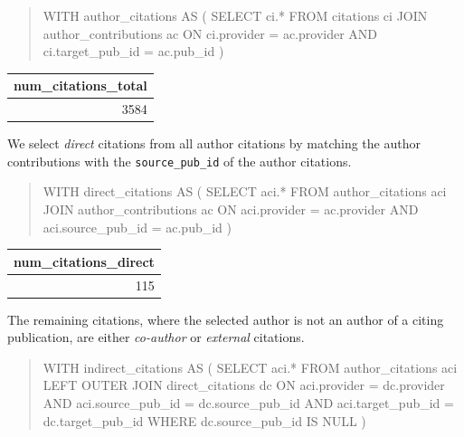 \begin{quote}
    \begin{vercode}
WITH author_citations AS (
    SELECT ci.*
    FROM citations ci
        JOIN author_contributions ac
            ON ci.provider = ac.provider
                AND ci.target_pub_id = ac.pub_id
)
    \end{vercode}
\end{quote}

\begin{center}
    \begin{tabular}{|r|}
        \hline
        num\_citations\_total \\
        \hline\hline
        3584 \\
        \hline
    \end{tabular}
\end{center}

We select \emph{direct} citations from all author citations by matching the author contributions with the \texttt{source\_pub\_id} of the author citations.

\begin{quote}
    \begin{vercode}
WITH direct_citations AS (
    SELECT aci.*
    FROM author_citations aci
        JOIN author_contributions ac
            ON aci.provider = ac.provider
                AND aci.source_pub_id = ac.pub_id
)
    \end{vercode}
\end{quote}

\begin{center}
    \begin{tabular}{|r|}
        \hline
        num\_citations\_direct \\
        \hline\hline
        115 \\
        \hline
    \end{tabular}
\end{center}

The remaining citations, where the selected author is not an author of a citing publication, are either \emph{co-author} or \emph{external} citations.

\begin{quote}
    \begin{vercode}
WITH indirect_citations AS (
    SELECT aci.*
    FROM author_citations aci
        LEFT OUTER JOIN direct_citations dc
            ON aci.provider = dc.provider
                AND aci.source_pub_id = dc.source_pub_id
                AND aci.target_pub_id = dc.target_pub_id
    WHERE dc.source_pub_id IS NULL
)
    \end{vercode}
\end{quote}

